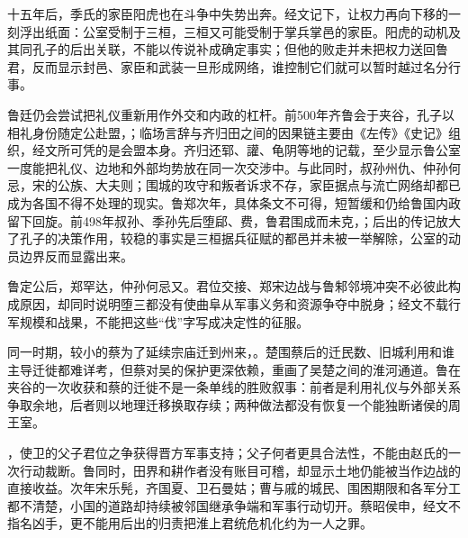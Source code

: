 十五年后，季氏的家臣阳虎也在斗争中失势出奔。经文记下，让权力再向下移的一刻浮出纸面：公室受制于三桓，三桓又可能受制于掌兵掌邑的家臣。阳虎的动机及其同孔子的后出关联，不能以传说补成确定事实；但他的败走并未把权力送回鲁君，反而显示封邑、家臣和武装一旦形成网络，谁控制它们就可以暂时越过名分行事。

鲁廷仍会尝试把礼仪重新用作外交和内政的杠杆。前500年齐鲁会于夹谷，孔子以相礼身份随定公赴盟，；临场言辞与齐归田之间的因果链主要由《左传》《史记》组织，经文所可凭的是会盟本身。齐归还郓、讙、龟阴等地的记载，至少显示鲁公室一度能把礼仪、边地和外部均势放在同一次交涉中。与此同时，叔孙州仇、仲孙何忌，宋的公族、大夫则；围城的攻守和叛者诉求不存，家臣据点与流亡网络却都已成为各国不得不处理的现实。鲁郑次年，具体条文不可得，短暂缓和仍给鲁国内政留下回旋。前498年叔孙、季孙先后堕郈、费，鲁君围成而未克，；后出的传记放大了孔子的决策作用，较稳的事实是三桓据兵征赋的都邑并未被一举解除，公室的动员边界反而显露出来。

鲁定公后，郑罕达，仲孙何忌又。君位交接、郑宋边战与鲁邾邻境冲突不必彼此构成原因，却同时说明堕三都没有使曲阜从军事义务和资源争夺中脱身；经文不载行军规模和战果，不能把这些“伐”字写成决定性的征服。

同一时期，较小的蔡为了延续宗庙迁到州来，。楚围蔡后的迁民数、旧城利用和谁主导迁徙都难详考，但蔡对吴的保护更深依赖，重画了吴楚之间的淮河通道。鲁在夹谷的一次收获和蔡的迁徙不是一条单线的胜败叙事：前者是利用礼仪与外部关系争取余地，后者则以地理迁移换取存续；两种做法都没有恢复一个能独断诸侯的周王室。

，使卫的父子君位之争获得晋方军事支持；父子何者更具合法性，不能由赵氏的一次行动裁断。鲁同时，田界和耕作者没有账目可稽，却显示土地仍能被当作边战的直接收益。次年宋乐髡，齐国夏、卫石曼姑；曹与戚的城民、围困期限和各军分工都不清楚，小国的道路却持续被邻国继承争端和军事行动切开。蔡昭侯申，经文不指名凶手，更不能用后出的归责把淮上君统危机化约为一人之罪。

